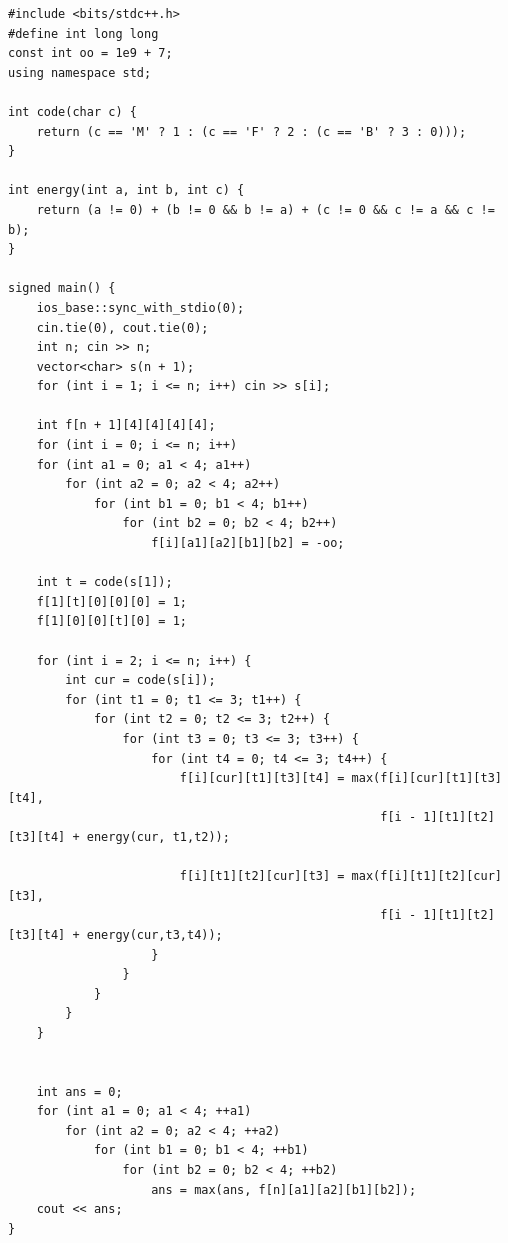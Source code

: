 \begin{lstlisting}[title=\centering\textbf{Cài đặt}]
#include <bits/stdc++.h>
#define int long long
const int oo = 1e9 + 7;
using namespace std;

int code(char c) {
    return (c == 'M' ? 1 : (c == 'F' ? 2 : (c == 'B' ? 3 : 0)));
}

int energy(int a, int b, int c) {
    return (a != 0) + (b != 0 && b != a) + (c != 0 && c != a && c != b);
}

signed main() {
    ios_base::sync_with_stdio(0); 
    cin.tie(0), cout.tie(0);
    int n; cin >> n;
    vector<char> s(n + 1);
    for (int i = 1; i <= n; i++) cin >> s[i];

    int f[n + 1][4][4][4][4];
    for (int i = 0; i <= n; i++)
    for (int a1 = 0; a1 < 4; a1++)
        for (int a2 = 0; a2 < 4; a2++)
            for (int b1 = 0; b1 < 4; b1++)
                for (int b2 = 0; b2 < 4; b2++)
                    f[i][a1][a2][b1][b2] = -oo;

    int t = code(s[1]);
    f[1][t][0][0][0] = 1;
    f[1][0][0][t][0] = 1;

    for (int i = 2; i <= n; i++) {
        int cur = code(s[i]);
        for (int t1 = 0; t1 <= 3; t1++) {
            for (int t2 = 0; t2 <= 3; t2++) {
                for (int t3 = 0; t3 <= 3; t3++) {
                    for (int t4 = 0; t4 <= 3; t4++) {
                        f[i][cur][t1][t3][t4] = max(f[i][cur][t1][t3][t4],
                                                    f[i - 1][t1][t2][t3][t4] + energy(cur, t1,t2));
                        
                        f[i][t1][t2][cur][t3] = max(f[i][t1][t2][cur][t3],
                                                    f[i - 1][t1][t2][t3][t4] + energy(cur,t3,t4));
                    }
                }
            }
        }
    }


    int ans = 0;
    for (int a1 = 0; a1 < 4; ++a1)
        for (int a2 = 0; a2 < 4; ++a2)
            for (int b1 = 0; b1 < 4; ++b1)
                for (int b2 = 0; b2 < 4; ++b2)
                    ans = max(ans, f[n][a1][a2][b1][b2]);
    cout << ans;
}
\end{lstlisting}


